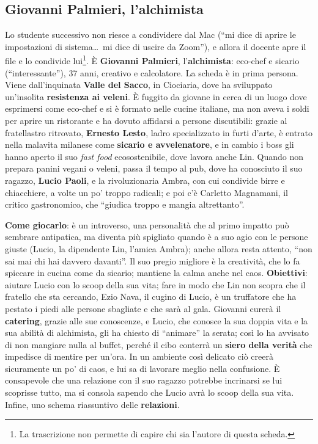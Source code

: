 \subsection{Giovanni Palmieri, l'alchimista}

Lo studente successivo non riesce a condividere dal Mac (``mi dice di aprire le
impostazioni di sistema\ldots\ mi dice di uscire da Zoom''), e allora il docente
apre il file e lo condivide lui\footnote{La trascrizione non permette di capire
chi sia l'autore di questa scheda.}. È \textbf{Giovanni Palmieri},
l'\textbf{alchimista}: eco-chef e sicario (``interessante''), 37 anni, creativo e
calcolatore. La scheda è in prima persona. Viene dall'inquinata \textbf{Valle del
Sacco}, in Ciociaria, dove ha sviluppato un'insolita \textbf{resistenza ai
veleni}. È fuggito da giovane in cerca di un luogo dove esprimersi come eco-chef e
si è formato nelle cucine italiane, ma non aveva i soldi per aprire un ristorante
e ha dovuto affidarsi a persone discutibili: grazie al fratellastro ritrovato,
\textbf{Ernesto Lesto}, ladro specializzato in furti d'arte, è entrato nella
malavita milanese come \textbf{sicario e avvelenatore}, e in cambio i boss gli
hanno aperto il suo \emph{fast food} ecosostenibile, dove lavora anche Lin. Quando
non prepara panini vegani o veleni, passa il tempo al pub, dove ha conosciuto il
suo ragazzo, \textbf{Lucio Paoli}, e la rivoluzionaria Ambra, con cui condivide
birre e chiacchiere, a volte un po' troppo radicali; e poi c'è Carletto Magnamani,
il critico gastronomico, che ``giudica troppo e mangia altrettanto''.

\textbf{Come giocarlo}: è un introverso, una personalità che al primo impatto può
sembrare antipatica, ma diventa più spigliato quando è a suo agio con le persone
giuste (Lucio, la dipendente Lin, l'amica Ambra); anche allora resta attento,
``non sai mai chi hai davvero davanti''. Il suo pregio migliore è la creatività,
che lo fa spiccare in cucina come da sicario; mantiene la calma anche nel caos.
\textbf{Obiettivi}: aiutare Lucio con lo scoop della sua vita; fare in modo che Lin
non scopra che il fratello che sta cercando, Ezio Nava, il cugino di Lucio, è un
truffatore che ha pestato i piedi alle persone sbagliate e che sarà al gala.
Giovanni curerà il \textbf{catering}, grazie alle sue conoscenze, e Lucio, che
conosce la sua doppia vita e la sua abilità di alchimista, gli ha chiesto di
``animare'' la serata; così lo ha avvisato di non mangiare nulla al buffet,
perché il cibo conterrà un \textbf{siero della verità} che impedisce di mentire
per un'ora. In un ambiente così delicato ciò creerà sicuramente un po' di caos, e
lui sa di lavorare meglio nella confusione. È consapevole che una relazione con il
suo ragazzo potrebbe incrinarsi se lui scoprisse tutto, ma si consola sapendo che
Lucio avrà lo scoop della sua vita. Infine, uno schema riassuntivo delle
\textbf{relazioni}.

